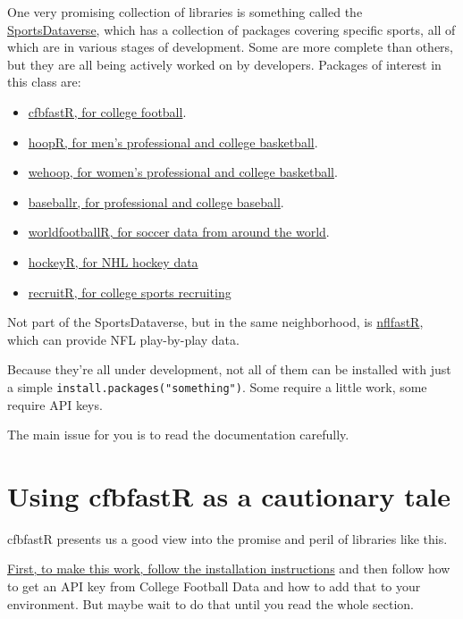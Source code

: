 \documentclass[
  letterpaper,
  DIV=11,
  numbers=noendperiod]{scrreprt}
\providecommand{\tightlist}{%
  \setlength{\itemsep}{0pt}\setlength{\parskip}{0pt}}\usepackage{longtable,booktabs,array}
\begin{document}
One very promising collection of libraries is something called the
\href{https://sportsdataverse.org/}{SportsDataverse}, which has a
collection of packages covering specific sports, all of which are in
various stages of development. Some are more complete than others, but
they are all being actively worked on by developers. Packages of
interest in this class are:

\begin{itemize}
\tightlist
\item
  \href{https://saiemgilani.github.io/cfbfastR/}{cfbfastR, for college
  football}.
\item
  \href{https://saiemgilani.github.io/hoopR/}{hoopR, for men's
  professional and college basketball}.
\item
  \href{https://saiemgilani.github.io/wehoop/}{wehoop, for women's
  professional and college basketball}.
\item
  \href{https://billpetti.github.io/baseballr/}{baseballr, for
  professional and college baseball}.
\item
  \href{https://jaseziv.github.io/worldfootballR/}{worldfootballR, for
  soccer data from around the world}.
\item
  \href{https://hockeyr.netlify.app/}{hockeyR, for NHL hockey data}
\item
  \href{https://saiemgilani.github.io/recruitR/}{recruitR, for college
  sports recruiting}
\end{itemize}

Not part of the SportsDataverse, but in the same neighborhood, is
\href{https://www.nflfastr.com/}{nflfastR}, which can provide NFL
play-by-play data.

Because they're all under development, not all of them can be installed
with just a simple \texttt{install.packages("something")}. Some require
a little work, some require API keys.

The main issue for you is to read the documentation carefully.

\hypertarget{using-cfbfastr-as-a-cautionary-tale}{%
\section{Using cfbfastR as a cautionary
tale}\label{using-cfbfastr-as-a-cautionary-tale}}

cfbfastR presents us a good view into the promise and peril of libraries
like this.

\href{https://saiemgilani.github.io/cfbfastR/}{First, to make this work,
follow the installation instructions} and then follow how to get an API
key from College Football Data and how to add that to your environment.
But maybe wait to do that until you read the whole section.
\end{document}
